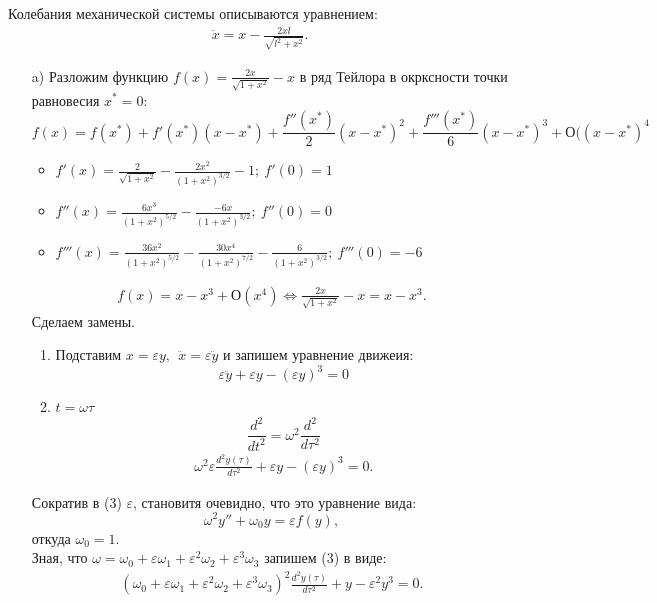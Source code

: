 \documentclass[12pt]{article}
\begin{document}
    \pagestyle{fancy} 
        \fancyhead{}
    \fancyfoot{} 

    Колебания механической системы описываются уравнением:
    \begin{eqnarray}
        \ddot{x} = x- \frac{2xl}{\sqrt{{ l^2+x^2 }}}.
    \end{eqnarray} 
    \begin{itemize}
        \item[a)]
        Разложим функцию $f(x)= \frac{2x}{\sqrt{{ 1+x^2 }}}-x$ в ряд Тейлора в окрксности точки равновесия $x^*=0$:
        $$f(x)= f(x^*)+f'(x^*)(x-x^*)+\frac{f''(x^*)}{2}(x-x^*)^2+\frac{f'''(x^*)}{6}(x-x^*)^3+О((x-x^*)^4$$
        \begin{itemize}
            \item $f'(x)=\frac{2}{\sqrt{1+x^2}}-\frac{2x^2}{(1+x^2)^{3/2}}-1;\:f'(0)=1$
            \item $f''(x)=\frac{6x^3}{(1+x^2)^{5/2}}-\frac{-6x}{(1+x^2)^{3/2}};\:f''(0)=0$
            \item $f'''(x)=\frac{36x^2}{(1+x^2)^{5/2}}-\frac{30x^4}{(1+x^2)^{7/2}}-\frac{6}{(1+x^2)^{3/2}};\:f'''(0)=-6$
        \end{itemize}
        \begin{eqnarray} f(x)=x-x^3+О(x^4)\Leftrightarrow \frac{2x}{\sqrt{{ 1+x^2 }}}-x=x-x^3.\end{eqnarray}
        Сделаем замены.
        \begin{enumerate}
            \item Подставим $x=\varepsilon y,\:\:\ddot x = \varepsilon \ddot y$ и запишем уравнение движеия:
            $$\varepsilon \ddot y+\varepsilon y-(\varepsilon y)^3=0$$
            \item $t=\omega \tau$
            $$\frac{d^2}{dt^2}=\omega^2\frac{d^2}{d\tau^2}$$
            \begin{eqnarray}\omega^2\varepsilon\frac{d^2y(\tau)}{d\tau^2}+\varepsilon y-(\varepsilon y)^3=0.\end{eqnarray}
        \end{enumerate}
        Сократив в (3) $\varepsilon$, становитя очевидно, что это уравнение вида:
        $$\omega^2y''+\omega_0y=\varepsilon f(y),$$
        откуда $\omega_0=1$.\\
        Зная, что $\omega=\omega_0+\varepsilon\omega_1+\varepsilon^2\omega_2+\varepsilon^3\omega_3$ запишем (3) в виде:
        \begin{eqnarray}
            (\omega_0+\varepsilon\omega_1+\varepsilon^2\omega_2+\varepsilon^3\omega_3)^2\frac{d^2y(\tau)}{d\tau^2}+y-\varepsilon^2y^3=0.

\end{eqnarray}
\end{itemize}
\end{document}
